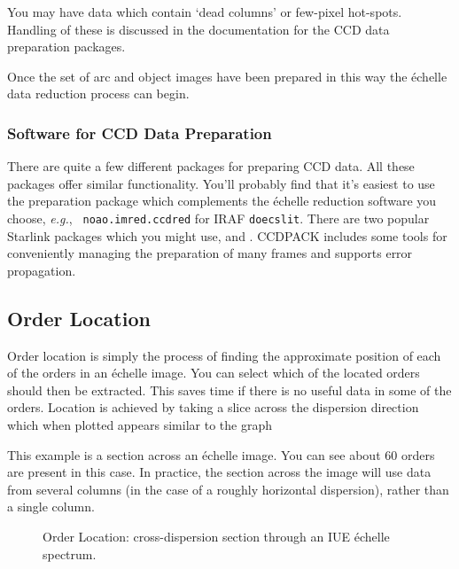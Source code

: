 You may have data which contain `dead columns' or few-pixel hot-spots.
Handling of these is discussed in the documentation for the CCD data
preparation packages.

Once the set of arc and object images have been prepared in this way the
\'{e}chelle data reduction process can begin.


\subsubsection{Software for CCD Data Preparation}

There are quite a few different packages for preparing CCD data. All
these packages offer similar functionality.  You'll probably find that
it's easiest to use the preparation package which complements the
\'{e}chelle reduction software you choose, {\em e.g.}, {\tt
noao.imred.ccdred} for IRAF {\tt doecslit}\@.  There are two popular
Starlink packages which you might use,
 and \@.  CCDPACK includes
some tools for conveniently managing the preparation of many frames and
supports error propagation.


\subsection{\label{se_order_location}Order Location}

Order location is simply the process of finding the approximate position
of each of the orders in an \'{e}chelle image.  You can select which of the
located orders should then be extracted.  This saves time if there is no
useful data in some of the orders.  Location is achieved by taking a
slice across the dispersion direction which when plotted appears similar
to the graph 

This example is a section across an  \'{echelle}
image.
You can see about 60 orders are present in this case.
In practice, the section across the image will use data from several
columns (in the case of a roughly horizontal dispersion), rather than
a single column.

\begin{figure}
\begin{center}
{\leavevmode\epsfysize=136mm}

\parbox{140mm}{
\caption{Order Location: cross-dispersion section through an IUE
         \'{e}chelle spectrum.}
\label{fi_scan_plot}
}
\end{center}
\end{figure}



